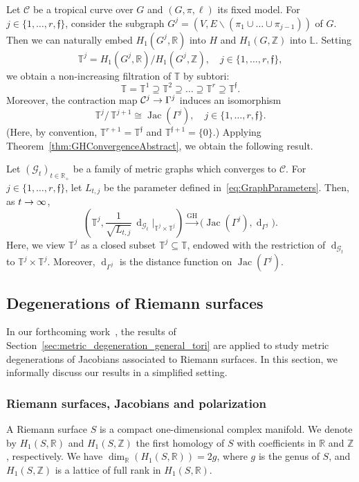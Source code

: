 \documentclass[AHL,Unicode,longabstracts]{cedram}
\newcommand{\rest}[1]{\vert_{#1}}
\newcommand{\rquot}[2]{#1/\,#2}
\DeclareMathOperator{\Jac}{Jac}
\DeclareMathOperator{\dist}{d}
\newcommand{\R}{\mathbb{R}}
\newcommand{\Z}{\mathbb{Z}}
\newcommand{\T}{\mathbb{T}}
\renewcommand{\L}{\mathbb{L}}
\newcommand{\mgr}{\mathcal{G}}
\newcommand{\curve}{\mathcal{C}}
\newcommand{\fin}{\mathfrak f}
\renewcommand{\setminus}{\smallsetminus}
\newcommand{\GH}{\mathrm{GH}}
\renewcommand*{\to}{\mathchoice{\longrightarrow}{\rightarrow}{\rightarrow}{\rightarrow}}
\begin{document}
Let $\curve$ be a tropical curve over $G$ and $(G, \pi, \ell)$ its fixed model. For $j \in \{1, \dots, r, \fin \}$, consider the subgraph $G^j = (V, E \setminus (\pi_1 \cup \dots \cup \pi_{j-1}))$ of $G$. Then we can naturally embed $H_1(G^j, \R)$ into $H$ and $H_1(G, \Z)$ into $\L$. Setting
\[
\T^j = H_1\left(G^j, \R\right) / H_1\left(G^j, \Z\right), \quad j \in \{1, \dots, r, \fin\},
\]
we obtain a non-increasing filtration of $\T$ by subtori:
\[
\T = \T^1 \supseteq \T^2 \supseteq \dots \supseteq \T^r \supseteq \T^\fin.
\]
Moreover, the contraction map $\curve^j \to \Gamma^j$ induces an isomorphism
\[
\rquot{\T^j}{\T^{j+1}} \cong\Jac(\Gamma^j), \quad j \in \{1, \dots,r, \fin\}.
\]
(Here, by convention, $\T^{r+1} = \T^\fin$ and $\T^{\fin +1} = \{0\}$.) Applying Theorem~\ref{thm:GHConvergenceAbstract}, we obtain the following result.


\begin{coro}
Let $(\mgr_t)_{t \in \R_+}$ be a family of metric graphs which converges to $\curve$. For $j \in \{1, \dots, r, \fin \}$, let $L_{t,j}$ be the parameter defined in~\eqref{eq:GraphParameters}. Then, as $t \to \infty$,
\[
\left(\T^j,\frac{1}{\sqrt{L_{t,j}}} \,\dist_{\mgr_t} \rest{\T^j\times \T^j} \right) \xrightarrow{\GH} \bigl (\Jac(\Gamma^j), \dist_{\Gamma^j} \bigr).
\]
Here, we view $\T^j$ as a closed subset $\T^j \subseteq \T$, endowed with the restriction of $\dist_{\mgr_t}$ to $\T^j\times \T^j$. Moreover, $\dist_{\Gamma^j}$ is the distance function on $\Jac(\Gamma^j)$.
\end{coro}


\subsection{Degenerations of Riemann surfaces} \label{ss:DegenerationsRiemannSurfaces}
In our forthcoming work~\cite{AN-AG-hybrid}, the results of Section~\ref{sec:metric_degeneration_general_tori} are applied to study metric degenerations of Jacobians associated to Riemann surfaces. In this section, we informally discuss our results in a simplified setting.

\subsubsection{Riemann surfaces, Jacobians and polarization}

A Riemann surface $S$ is a compact one-dimensional complex manifold. We denote by $H_1(S, \R)$ and $H_1(S, \Z)$ the first homology of $S$ with coefficients in $\R$ and $\Z$, respectively. We have $\dim_\R (H_1(S, \R)) = 2g$, where $g$ is the genus of $S$, and $H_1(S, \Z)$ is a lattice of full rank in $H_1(S, \R)$.
\end{document}
